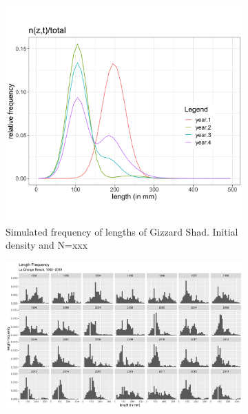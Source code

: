 \documentclass[preprint,review,12pt,authoryear]{elsarticle}
\begin{document}

%
%

\begin{figure}
\centering
\begin{subfigure}[b]{.43\textwidth}
  \includegraphics[width=\textwidth]{figures/sim.png}
\caption{Simulated frequency of lengths of Gizzard Shad.  Initial density  and N=xxx}
\label{fig:length_dist}
\end{subfigure}
\begin{subfigure}[b]{.43\textwidth}
\includegraphics[width=\textwidth]{figures/LTRMgraph.pdf}

\end{subfigure}
\end{figure}
\end{document}
